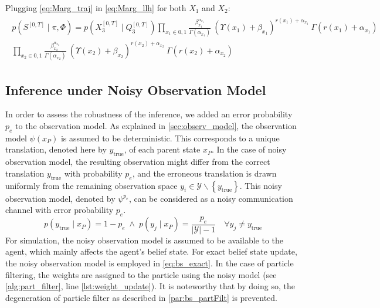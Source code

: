 Plugging \autoref{eq:Marg_traj} in \autoref{eq:Marg_llh} for both $ X_{1} $ and $ X_{2} $:
\begin{align}
\begin{split}
p(S^{[0,T]} \mid \pi, \Phi ) = p(X_{3}^{[0, T]}\mid Q_{3}^{[0, T]}) \prod_{x_{1}\in{0,1}} \frac{\beta_{x_{1}}^{\alpha_{x_{1}}}}{\Gamma(\alpha_{x_{1}})} \ (\Upsilon(x_{1})+\beta_{x_{1}})^{r(x_{1}) + \alpha_{x_{1}}}\ \Gamma(r(x_{1}) + \alpha_{x_{1}})  \\  \prod_{x_{2}\in{0,1}} \frac{\beta_{x_{2}}^{\alpha_{x_{2}}}}{\Gamma(\alpha_{x_{2}})} \ (\Upsilon(x_{2})+\beta_{x_{2}})^{{r(x_2)} + \alpha_{x_{2}}}\ \Gamma(r(x_2) + \alpha_{x_{2}})
\label{eq:Marg_llh_final}
\end{split}
\end{align}

\subsection{Inference under Noisy Observation Model}
\label{sec:noisy_robustness}
In order to assess the robustness of the inference, we added an error probability $ p_e $ to the observation model. As explained in \cref{sec:observ_model}, the observation model $ \psi(x_P) $ is assumed to be deterministic. This corresponds to a unique translation, denoted here by $ y_\text{true} $, of each parent state $ x_P $. In the case of noisy observation model, the resulting observation might differ from the correct translation $ y_\text{true} $ with probability $ p_e $, and the erroneous translation is drawn uniformly from the remaining observation space $ y_i \in \mathcal{Y} \backslash \left\lbrace y_\text{true}\right\rbrace $. This noisy observation model, denoted by $ \psi^{p_e} $, can be considered as a noisy communication channel with error probability $ p_e $. \begin{equation}
p(y_\text{true} \mid x_P) = 1-p_e \;\wedge \;p(y_j \mid x_P) = \frac{p_e}{|\mathcal{Y}|-1} \quad \forall y_j \neq y_\text{true}
\label{eq:noicy_obs_model}
\end{equation} 
For simulation, the noisy observation model is assumed to be available to the agent, which mainly affects the agent's belief state. For exact belief state update, the noisy observation model is employed in \autoref{eq:bs_exact}. In the case of particle filtering, the weights are assigned to the particle using the noisy model (see \cref{alg:part_filter}, line \autoref{lst:weight_update}). It is noteworthy that by doing so, the degeneration of particle filter as described in \cref{par:bs_partFilt} is prevented.
